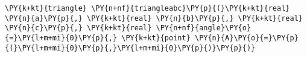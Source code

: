 \begin{Verbatim}[commandchars=\\\{\}]
    \PY{k+kt}{triangle} \PY{n+nf}{triangleabc}\PY{p}{(}\PY{k+kt}{real} \PY{n}{a}\PY{p}{,} \PY{k+kt}{real} \PY{n}{b}\PY{p}{,} \PY{k+kt}{real} \PY{n}{c}\PY{p}{,} \PY{k+kt}{real} \PY{n+nf}{angle}\PY{o}{=}\PY{l+m+mi}{0}\PY{p}{,} \PY{k+kt}{point} \PY{n}{A}\PY{o}{=}\PY{p}{(}\PY{l+m+mi}{0}\PY{p}{,}\PY{l+m+mi}{0}\PY{p}{)}\PY{p}{)}
\end{Verbatim}
